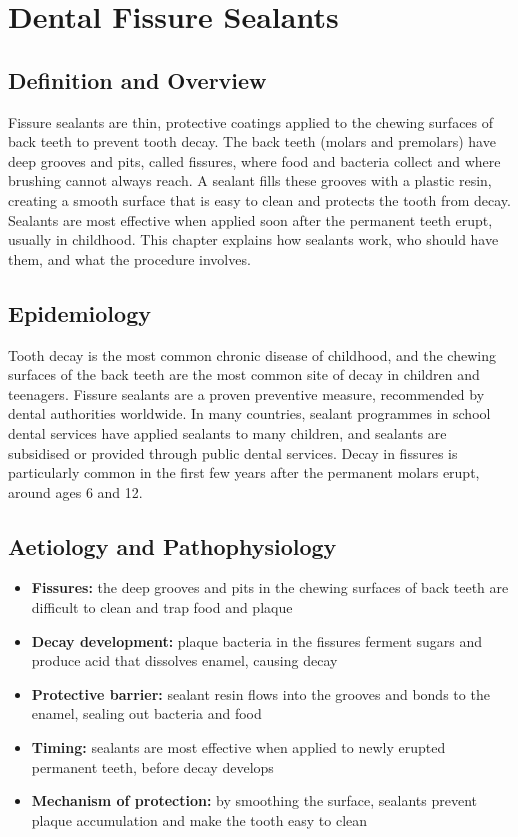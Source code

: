 \chapter{Dental Fissure Sealants}

\section*{Definition and Overview}
Fissure sealants are thin, protective coatings applied to the chewing surfaces of back teeth to prevent tooth decay. The back teeth (molars and premolars) have deep grooves and pits, called fissures, where food and bacteria collect and where brushing cannot always reach. A sealant fills these grooves with a plastic resin, creating a smooth surface that is easy to clean and protects the tooth from decay. Sealants are most effective when applied soon after the permanent teeth erupt, usually in childhood. This chapter explains how sealants work, who should have them, and what the procedure involves.

\section*{Epidemiology}
Tooth decay is the most common chronic disease of childhood, and the chewing surfaces of the back teeth are the most common site of decay in children and teenagers. Fissure sealants are a proven preventive measure, recommended by dental authorities worldwide. In many countries, sealant programmes in school dental services have applied sealants to many children, and sealants are subsidised or provided through public dental services. Decay in fissures is particularly common in the first few years after the permanent molars erupt, around ages 6 and 12.

\section*{Aetiology and Pathophysiology}
\begin{itemize}
    \item \textbf{Fissures:} the deep grooves and pits in the chewing surfaces of back teeth are difficult to clean and trap food and plaque
    \item \textbf{Decay development:} plaque bacteria in the fissures ferment sugars and produce acid that dissolves enamel, causing decay
    \item \textbf{Protective barrier:} sealant resin flows into the grooves and bonds to the enamel, sealing out bacteria and food
    \item \textbf{Timing:} sealants are most effective when applied to newly erupted permanent teeth, before decay develops
    \item \textbf{Mechanism of protection:} by smoothing the surface, sealants prevent plaque accumulation and make the tooth easy to clean
\end{itemize}

